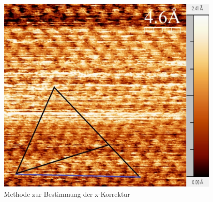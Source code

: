 \documentclass[12pt,a4paper]{article}
\begin{document}
\begin{figure}
\centering
\includegraphics[scale=0.54]{Bilder/Atome/strom2_h_scale.jpg}
\caption{Methode zur Bestimmung der x-Korrektur}
\label{fig:strom2_h}
\end{figure}
\end{document}
